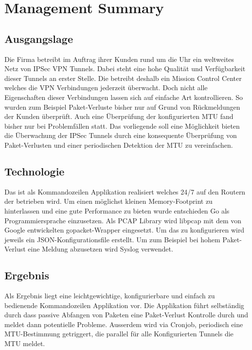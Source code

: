 
\chapter*{Management Summary}

\section*{Ausgangslage}
Die Firma \osag betreibt im Auftrag ihrer Kunden rund um die Uhr ein weltweites Netz von \acs{IPSec} \acs{VPN} Tunnels. Dabei steht eine hohe Qualität und Verfügbarkeit dieser Tunnels an erster Stelle. Die \osag betreibt deshalb ein Mission Control Center welches die \acs{VPN} Verbindungen jederzeit überwacht. Doch nicht alle Eigenschaften dieser Verbindungen lassen sich auf einfache Art kontrollieren. So wurden zum Beispiel Paket-Verluste bisher nur auf Grund von Rückmeldungen der Kunden überprüft. Auch eine Überprüfung der konfigurierten \acs{MTU} fand bisher nur bei Problemfällen statt. Das vorliegende \tool soll eine Möglichkeit bieten die Überwachung der \acs{IPSec} Tunnels durch eine konsequente Überprüfung von Paket-Verlusten und einer periodischen Detektion der \acs{MTU} zu vereinfachen.

\section*{Technologie}
Das \tool ist als Kommandozeilen Applikation realisiert welches 24/7 auf den Routern der \osag betrieben wird. Um einen möglichst kleinen Memory-Footprint zu hinterlassen und eine gute Performance zu bieten wurde entschieden Go als Programmiersprache einzusetzen. Als \acs{PCAP} Library wird libpcap mit dem von Google entwickelten gopacket-Wrapper eingesetzt. Um das \tool zu konfigurieren wird jeweils ein JSON-Konfigurationsfile erstellt. Um zum Beispiel bei hohem Paket-Verlust eine Meldung abzusetzen wird Syslog verwendet.

\section*{Ergebnis}
Als Ergebnis liegt eine leichtgewichtige, konfigurierbare und einfach zu bedienende Kommandozeilen Applikation vor. Die Applikation führt selbständig durch dass passive Abfangen von Paketen eine Paket-Verlust Kontrolle durch und meldet dann potentielle Probleme. Ausserdem wird via Cronjob, periodisch eine \acs{MTU}-Bestimmung getriggert, die parallel für alle Konfigurierten Tunnels die \acs{MTU} meldet.

